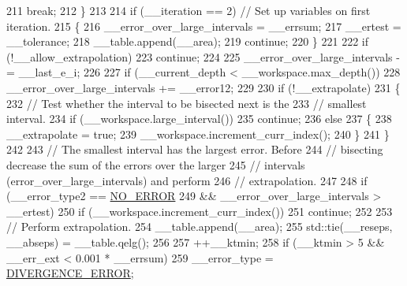 \begin{DoxyCode}
211               \textcolor{keywordflow}{break};
212             \}
213 
214           \textcolor{keywordflow}{if} (\_\_iteration == 2) \textcolor{comment}{// Set up variables on first iteration.}
215             \{
216               \_\_error\_over\_large\_intervals = \_\_errsum;
217               \_\_ertest = \_\_tolerance;
218               \_\_table.append(\_\_area);
219               \textcolor{keywordflow}{continue};
220             \}
221 
222           \textcolor{keywordflow}{if} (!\_\_allow\_extrapolation)
223             \textcolor{keywordflow}{continue};
224 
225           \_\_error\_over\_large\_intervals -= \_\_last\_e\_i;
226 
227           \textcolor{keywordflow}{if} (\_\_current\_depth < \_\_workspace.max\_depth())
228             \_\_error\_over\_large\_intervals += \_\_error12;
229 
230           \textcolor{keywordflow}{if} (!\_\_extrapolate)
231             \{
232               \textcolor{comment}{// Test whether the interval to be bisected next is the}
233               \textcolor{comment}{// smallest interval.}
234               \textcolor{keywordflow}{if} (\_\_workspace.large\_interval())
235                 \textcolor{keywordflow}{continue};
236               \textcolor{keywordflow}{else}
237                 \{
238                   \_\_extrapolate = \textcolor{keyword}{true};
239                   \_\_workspace.increment\_curr\_index();
240                 \}
241             \}
242 
243           \textcolor{comment}{// The smallest interval has the largest error.  Before}
244           \textcolor{comment}{// bisecting decrease the sum of the errors over the larger}
245           \textcolor{comment}{// intervals (error\_over\_large\_intervals) and perform}
246           \textcolor{comment}{// extrapolation.}
247 
248           \textcolor{keywordflow}{if} (\_\_error\_type2 == \hyperlink{namespace____gnu__cxx_ad6c62dd86a596716cece6ac2d4cfd4b3ac31eecc280b10dec2efb4a2216ccc2e0}{NO\_ERROR}
249               && \_\_error\_over\_large\_intervals > \_\_ertest)
250             \textcolor{keywordflow}{if} (\_\_workspace.increment\_curr\_index())
251               \textcolor{keywordflow}{continue};
252 
253           \textcolor{comment}{// Perform extrapolation.}
254           \_\_table.append(\_\_area);
255           std::tie(\_\_reseps, \_\_abseps) = \_\_table.qelg();
256 
257           ++\_\_ktmin;
258           \textcolor{keywordflow}{if} (\_\_ktmin > 5 && \_\_err\_ext < 0.001 * \_\_errsum)
259             \_\_error\_type = \hyperlink{namespace____gnu__cxx_ad6c62dd86a596716cece6ac2d4cfd4b3a5a36b63b8fa7c921d9332c69416c2686}{DIVERGENCE\_ERROR};

\end{DoxyCode}
